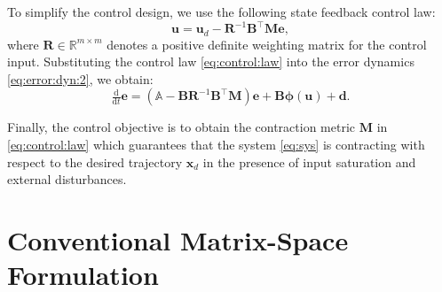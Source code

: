 \documentclass{ifacconf}
\newcommand\R{\mathbb{R}}
\newcommand*{\mv}[1]{\boldsymbol{#1}} %
\newcommand*{\mm}[1]{\boldsymbol{#1}} %
\newcommand\der{\mathrm d}
\newcommand*{\ddtt}{
   \tfrac{\der}{\der t}
}
\begin{document}
To simplify the control design, we use the following state feedback control law:
\begin{equation} \label{eq:control:law}
   \mv{u}
   =
   \mv{u}_d
   -
   \mm{R}^{-1} \mm{B}^\top \mm{M}
   \mv{e}
   ,
\end{equation}
where $\mm{R}\in\R^{m\times m}$ denotes a positive definite weighting matrix for the control input.
Substituting the control law \eqref{eq:control:law} into the error dynamics \eqref{eq:error:dyn:2}, we obtain:
\begin{equation} \label{eq:error:dyn:3}
   \ddtt\mv{e}
   \!=\!
   \left(
      \mathbb{A} - \mm{B} \mm{R}^{-1} \mm{B} ^\top \mm{M}
   \right)
   \mv{e}
   + \mm{B} \mv{\phi}(\mv{u}) + \mv{d}
   .
\end{equation}

Finally, the control objective is to obtain the contraction metric $\mm{M}$ in \eqref{eq:control:law} which guarantees that the system \eqref{eq:sys} is contracting with respect to the desired trajectory $\mv{x}_d$ in the presence of input saturation and external disturbances.

\section{Conventional Matrix-Space Formulation} \label{sec:conv:lmi}


\end{document}
